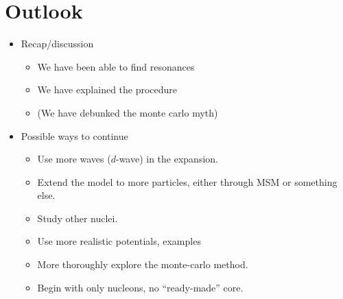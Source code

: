 \documentclass[../main/report.tex]{subfiles}
\begin{document}
\chapter{Outlook}
\label{cha:outlook}

\begin{itemize}
  \item Recap/discussion
  \begin{itemize}
    \item We have been able to find resonances
    \item We have explained the procedure
    \item (We have debunked the monte carlo myth)
  \end{itemize}
  \item Possible ways to continue
  \begin{itemize}
    \item Use more waves ($d$-wave) in the expansion.
    \item Extend the model to more particles, either through MSM or something else.
    \item Study other nuclei.
    \item Use more realistic potentials, examples
    \item More thoroughly explore the monte-carlo method.
    \item Begin with only nucleons, no ``ready-made'' core.
  \end{itemize}
\end{itemize}
\end{document}
